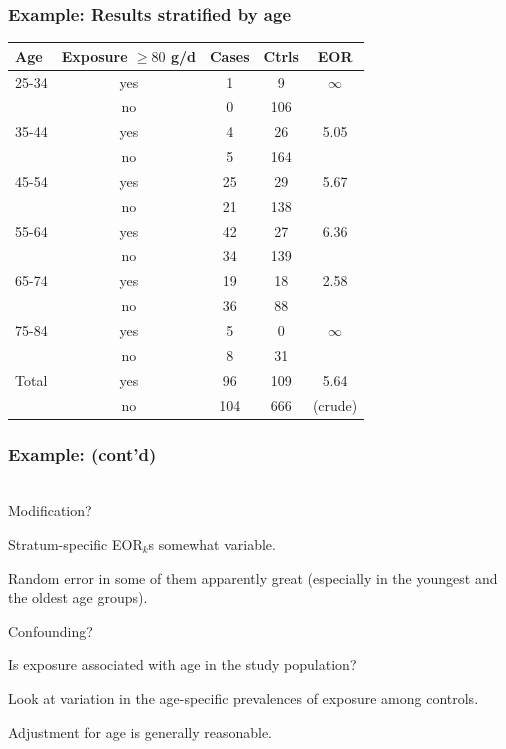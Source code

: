 \documentclass[handout,12pt]{beamer}
\begin{document}
\begin{frame} \frametitle{Example: Results stratified by age} 
{\scriptsize
\begin{center}
\begin{tabular}{lcccc}
\toprule
Age & Exposure $\geq 80$ g/d & Cases & Ctrls & EOR \\
\midrule
25-34 & yes         &  1 & 9 & $\infty$  \\
 { } & no                & 0 & 106 & { } \\
\cmidrule{2-5} 
35-44 & yes         &  4 & 26 &  5.05 \\
 { } & no                & 5 & 164 & { } \\
\cmidrule{2-5} 
45-54 & yes         &  25 & 29 & 5.67 \\
 { } & no                & 21 & 138 & { } \\
\cmidrule{2-5} 
55-64 & yes         &  42 & 27 & 6.36 \\
 { } & no                & 34 & 139 & { } \\
\cmidrule{2-5} 
65-74 & yes         &  19 & 18 & 2.58 \\
 { } & no                &  36 & 88 & { } \\
\cmidrule{2-5}
75-84 & yes         &  5 &  0 & $\infty$ \\
 { } & no                & 8 & 31 & { } \\
\bottomrule 
Total & yes   & 96 & 109 & 5.64 \\
{ }  & no    & 104 & 666 & {(crude)} \\
\bottomrule
\end{tabular}
\end{center}
}
\end{frame} 

\begin{frame}\frametitle{Example: (cont'd)} 
\ \\

Modification?
\bi
\item Stratum-specific EOR$_k$s somewhat variable.
\medskip
\item Random error in some of them apparently great (especially in the youngest and 
	the oldest age groups).
\ei

Confounding?
\bi
\item Is exposure associated with age in the study population?
\medskip 
\item Look at variation in the age-specific prevalences of exposure among controls.
\medskip
\item Adjustment for age is generally reasonable.
\ei
\end{frame} 
\end{document}
